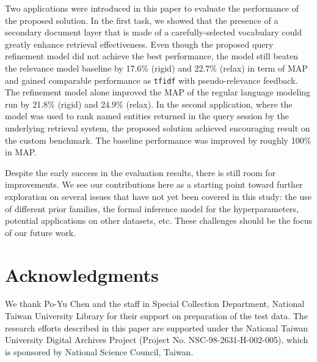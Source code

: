 Two applications were introduced in this paper to evaluate the performance of
the proposed solution.  In the first task, we showed that the presence of a
secondary document layer that is made of a carefully-selected vocabulary could
greatly enhance retrieval effectiveness.  Even though the proposed query
refinement model did not achieve the best performance, the model still beaten
the relevance model baseline by 17.6\% (rigid) and 22.7\% (relax) in term of
MAP and gained comparable performance as {\tt tfidf} with pseudo-relevance
feedback.  The refinement model alone improved the MAP of the regular language
modeling run by 21.8\% (rigid) and 24.9\% (relax).  In the second application,
where the model was used to rank named entities returned in the query session
by the underlying retrieval system, the proposed solution achieved encouraging
result on the custom benchmark.  The baseline performance was improved by
roughly 100\% in MAP.  

Despite the early success in the evaluation results, there is still room for
improvements.  We see our contributions here as a starting point toward further
exploration on several issues that have not yet been covered in this study: the
use of different prior families, the formal inference model for the
hyperparameters, potential applications on other datasets, etc.  These
challenges should be the focus of our future work.


\section*{Acknowledgments}


We thank Po-Yu Chen and the staff in Special Collection Department, National
Taiwan University Library for their support on preparation of the test data.
The research efforts described in this paper are supported under the National
Taiwan University Digital Archives Project (Project No.
NSC-98-2631-H-002-005), which is sponsored by National Science Council, Taiwan. 
